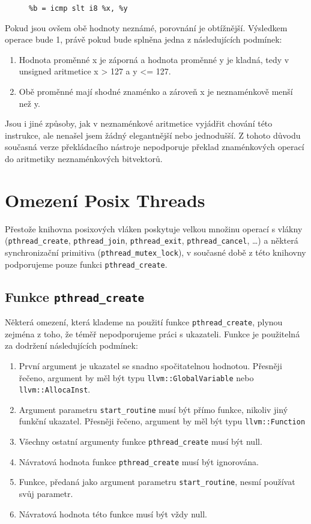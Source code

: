 \documentclass[12pt]{fithesis2}
\begin{document}
\begin{figure}[h!]
\begin{lstlisting}
%b = icmp slt i8 %x, %y
\end{lstlisting}
\end{figure}

Pokud jsou ovšem obě hodnoty neznámé, porovnání je obtížnější. Výsledkem operace bude 1, právě pokud bude splněna jedna z následujících podmínek:

\begin{enumerate}
\item Hodnota proměnné x je záporná a hodnota proměnné y je kladná, tedy v unsigned aritmetice x > 127 a y <= 127.
\item Obě proměnné mají shodné znaménko a zároveň x je neznaménkově menší než y.
\end{enumerate}

Jsou i jiné způsoby, jak v neznaménkové aritmetice vyjádřit chování této instrukce, ale nenašel jsem žádný elegantnější nebo jednodušší. Z tohoto důvodu současná verze překládacího nástroje nepodporuje překlad znaménkových operací do aritmetiky neznaménkových bitvektorů.

\section{Omezení Posix Threads}
Přestože knihovna posixových vláken poskytuje velkou množinu operací s vlákny (\texttt{pthread\_create}, \texttt{pthread\_join}, \texttt{pthread\_exit}, \texttt{pthread\_cancel}, \ldots) a některá synchronizační primitiva (\texttt{pthread\_mutex\_lock}), v současné době z této knihovny podporujeme pouze funkci \texttt{pthread\_create}.

\subsection{Funkce \texttt{pthread\_create}}
Některá omezení, která klademe na použití funkce \texttt{pthread\_create}, plynou zejména z toho, že téměř nepodporujeme práci s ukazateli. Funkce je použitelná za dodržení následujících podmínek:

\begin{enumerate}
\item První argument je ukazatel se snadno spočitatelnou hodnotou. Přesněji řečeno, argument by měl být typu \texttt{llvm::GlobalVariable} nebo \texttt{llvm::AllocaInst}.
\item Argument parametru \texttt{start\_routine} musí být přímo funkce, nikoliv jiný funkční ukazatel. Přesněji řečeno, argument by měl být typu \texttt{llvm::Function}
\item Všechny ostatní argumenty funkce \texttt{pthread\_create} musí být null.
\item Návratová hodnota funkce \texttt{pthread\_create} musí být ignorována.
\item Funkce, předaná jako argument parametru \texttt{start\_routine}, nesmí používat svůj parametr.
\item Návratová hodnota této funkce musí být vždy null.
\end{enumerate}
\end{document}
